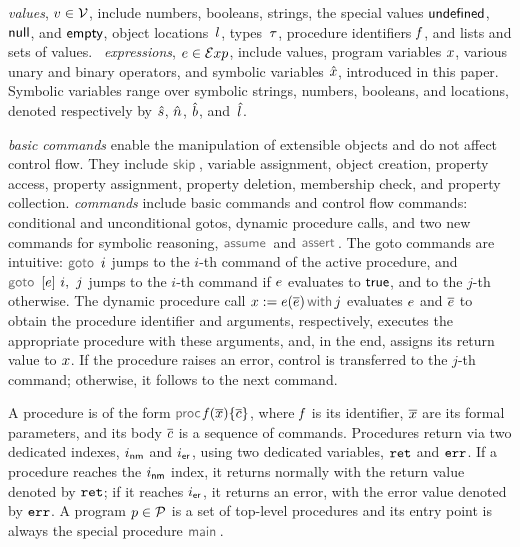 \vspace{2pt}
\noindent \jsil \emph{values}, $v \in \mathcal{V}$, include numbers, booleans, strings, the special values ${\sf undefined}$, ${\sf null}$, and ${\sf empty}$, object locations~$l$, types~$\tau$, procedure identifiers $\mathit{f}$, and lists and sets of values.
\jsil~\emph{expressions}, $e \in \mathcal{E}xp$, include \jsil values, \jsil program variables $x$, various unary and binary operators, and symbolic variables $\hat{x}$, introduced in this paper. Symbolic variables range over symbolic strings, numbers, booleans, and locations, denoted respectively by $\hat{s}$, $\hat{n}$, $\hat{b}$, and~$\hat{l}$.

%

\jsil \emph{basic commands} enable the manipulation of extensible objects and do not affect control flow. 
They include $\jsilskip$, variable assignment, object creation, property access, property assignment, property deletion, membership check, and property collection.
%
\jsil \emph{commands} include \jsil basic commands and control flow commands: conditional and unconditional gotos, dynamic procedure calls, and two new commands for symbolic reasoning, $\assume$ and $\jassert$.  %
The goto commands are intuitive: $\goto \ i$ jumps to the $i$-th command of the active procedure, and $\ifgoto{\jsilexpr}{i}{j}$ jumps to the $i$-th command if $e$ evaluates to ${\sf true}$, and to the $j$-th otherwise. 
The dynamic procedure call $\jsilcall{\jvar}{\jsilexpr}{\jvec{\jsilexpr}}{j}$ evaluates  $e$ and $\overline{e}$ to obtain the procedure identifier and arguments, respectively, executes the appropriate procedure with these arguments, and, in the end, assigns its return value to $x$.
If the procedure raises an error, control is transferred to the $j$-th command; otherwise, it follows to the next command. 
%

A \jsil procedure is of the form $\procedure{\pid}{\jvec{\jvar}}{\jvec{\jcmd}}$, where $\mathit{f}$ is its identifier, $\overline{x}$ are its formal parameters, and its body ${\overline{c}}$  is a sequence of \jsil commands. 
Procedures return via two dedicated indexes, $i_{{\sf nm}}$ and $i_{{\sf er}}$, using two dedicated variables, $\mathtt{ret}$ and $\mathtt{err}$. If a procedure reaches the $i_{{\sf nm}}$ index, it returns normally with the return value denoted by $\mathtt{ret}$; if it reaches $i_{{\sf er}}$, it returns an error, with the error value denoted by $\mathtt{err}$.
%
A \jsil program $p \in \mathcal{P}$ is a set of top-level procedures and its entry point is always the special procedure $\jsilmain$\hspace{-2pt}.


